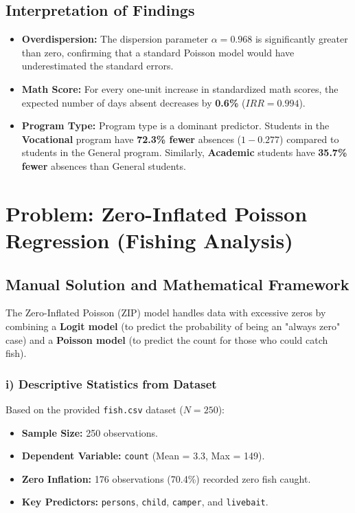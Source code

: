 \documentclass[12pt]{article}
\begin{document}
\subsection{Interpretation of Findings}
\begin{itemize}
    \item \textbf{Overdispersion:} The dispersion parameter $\alpha = 0.968$ is significantly greater than zero, confirming that a standard Poisson model would have underestimated the standard errors.
    \item \textbf{Math Score:} For every one-unit increase in standardized math scores, the expected number of days absent decreases by \textbf{0.6\%} ($IRR=0.994$).
    \item \textbf{Program Type:} Program type is a dominant predictor. Students in the \textbf{Vocational} program have \textbf{72.3\% fewer} absences ($1 - 0.277$) compared to students in the General program. Similarly, \textbf{Academic} students have \textbf{35.7\% fewer} absences than General students.
\end{itemize}











\newpage
\section{Problem: Zero-Inflated Poisson Regression (Fishing Analysis)}
\label{prob_zip_final}

\subsection{Manual Solution and Mathematical Framework}
The Zero-Inflated Poisson (ZIP) model handles data with excessive zeros by combining a \textbf{Logit model} (to predict the probability of being an "always zero" case) and a \textbf{Poisson model} (to predict the count for those who could catch fish).

\subsubsection{i) Descriptive Statistics from Dataset}
Based on the provided \texttt{fish.csv} dataset ($N=250$):
\begin{itemize}
    \item \textbf{Sample Size:} 250 observations.
    \item \textbf{Dependent Variable:} \texttt{count} (Mean = 3.3, Max = 149).
    \item \textbf{Zero Inflation:} 176 observations (70.4\%) recorded zero fish caught.
    \item \textbf{Key Predictors:} \texttt{persons}, \texttt{child}, \texttt{camper}, and \texttt{livebait}.
\end{itemize}
\end{document}
